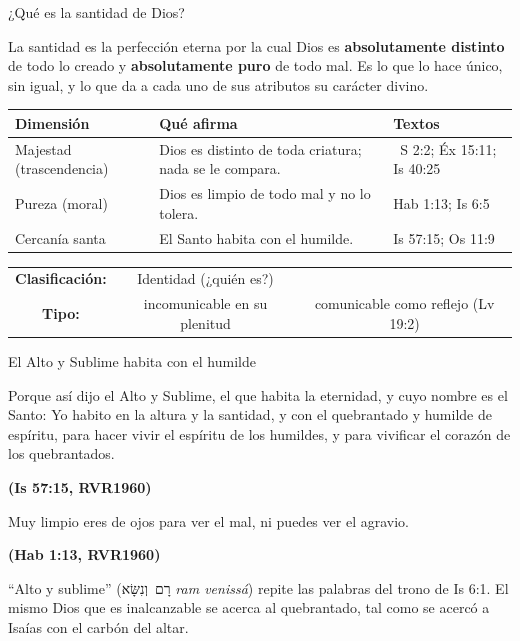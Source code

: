 \documentclass[hyperref={bookmarks=false},aspectratio=169]{beamer}
\newcommand{\heb}[1]{\mbox{\foreignlanguage{hebrew}{#1}}}
\newcommand{\fuente}[1]{\par\hfill{\upshape\bfseries\footnotesize\textcolor{azul}{#1}}}
\newcommand{\destacar}[1]{\textbf{\textcolor{azul}{#1}}}
\begin{document}
\begin{frame}{¿Qué es la santidad de Dios?}
\begin{tcolorbox}[colback=papiro,colframe=azul,boxrule=1pt,arc=3pt,fonttitle=\bfseries\small,title=Definición]
\small La santidad es la perfección eterna por la cual Dios es \destacar{absolutamente distinto} de todo lo creado y \destacar{absolutamente puro} de todo mal. Es lo que lo hace único, sin igual, y lo que da a cada uno de sus atributos su carácter divino.
\end{tcolorbox}
\scriptsize\renewcommand{\arraystretch}{1.25}
\begin{tabular}{@{}>{\RaggedRight\arraybackslash}p{2.6cm}>{\RaggedRight\arraybackslash}p{5.0cm}>{\RaggedRight\arraybackslash}p{4.0cm}@{}}
\toprule
\textbf{Dimensión} & \textbf{Qué afirma} & \textbf{Textos} \\ \midrule
Majestad (trascendencia) & Dios es distinto de toda criatura; nada se le compara. & 1~S 2:2; Éx 15:11; Is 40:25 \\
Pureza (moral) & Dios es limpio de todo mal y no lo tolera. & Hab 1:13; Is 6:5 \\
Cercanía santa & El Santo habita con el humilde. & Is 57:15; Os 11:9 \\
\bottomrule
\end{tabular}\par\smallskip
\begin{center}\footnotesize
\begin{tabular}{ccc}
\textbf{Clasificación:} & Identidad (¿quién es?) & \\
\textbf{Tipo:} & incomunicable en su plenitud & comunicable como reflejo (Lv 19:2)\\
\end{tabular}
\end{center}
\end{frame}

\begin{frame}{El Alto y Sublime habita con el humilde}
\begin{cita}Porque así dijo el Alto y Sublime, el que habita la eternidad, y cuyo nombre es el Santo: Yo habito en la altura y la santidad, y con el quebrantado y humilde de espíritu, para hacer vivir el espíritu de los humildes, y para vivificar el corazón de los quebrantados.\fuente{(Is 57:15, RVR1960)}\end{cita}
\begin{cita}Muy limpio eres de ojos para ver el mal, ni puedes ver el agravio.\fuente{(Hab 1:13, RVR1960)}\end{cita}
\small ``Alto y sublime'' (\heb{רָם וְנִשָּׂא} \emph{ram venissá}) repite las palabras del trono de Is 6:1. El mismo Dios que es inalcanzable se acerca al quebrantado, tal como se acercó a Isaías con el carbón del altar.
\end{frame}
\end{document}
